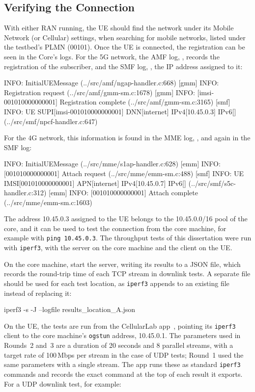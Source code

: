 \subsection{Verifying the Connection}
\label{sec:app-verify}
With either \gls{RAN} running, the \gls{UE} should find the network under its Mobile Network (or Cellular) settings, when searching for mobile networks, listed under the testbed's \gls{PLMN} (00101). Once the \gls{UE} is connected, the registration can be seen in the Core's logs. For the 5G network, the \gls{AMF} log, , records the registration of the subscriber, and the \gls{SMF} log, , the IP address assigned to it:
\begin{code}
[amf] INFO: InitialUEMessage (../src/amf/ngap-handler.c:668)
[gmm] INFO: Registration request (../src/amf/gmm-sm.c:1678)
[gmm] INFO: [imsi-001010000000001] Registration complete (../src/amf/gmm-sm.c:3165)
[smf] INFO: UE SUPI[imsi-001010000000001] DNN[internet] IPv4[10.45.0.3] IPv6[] (../src/smf/npcf-handler.c:647)
\end{code}
For the 4G network, this information is found in the \gls{MME} log, , and again in the \gls{SMF} log:
\begin{code}
[mme] INFO: InitialUEMessage (../src/mme/s1ap-handler.c:628)
[emm] INFO: [001010000000001] Attach request (../src/mme/emm-sm.c:488)
[smf] INFO: UE IMSI[001010000000001] APN[internet] IPv4[10.45.0.7] IPv6[] (../src/smf/s5c-handler.c:312)
[emm] INFO: [001010000000001] Attach complete (../src/mme/emm-sm.c:1603)
\end{code}
The address 10.45.0.3 assigned to the \gls{UE} belongs to the 10.45.0.0/16 pool of the core, and it can be used to test the connection from the core machine, for example with \texttt{ping 10.45.0.3}. The throughput tests of this dissertation were run with \texttt{iperf3}, with the server on the core machine and the client on the \gls{UE}.

On the core machine, start the server, writing its results to a JSON file, which records the round-trip time of each TCP stream in downlink tests. A separate file should be used for each test location, as \texttt{iperf3} appends to an existing file instead of replacing it:

\begin{code}
iperf3 -s -J --logfile results_location_A.json
\end{code}

On the \gls{UE}, the tests are run from the CellularLab app~\cite{cellularlab}, pointing its \texttt{iperf3} client to the core machine's \texttt{ogstun} address, 10.45.0.1. The parameters used in Rounds~2 and~3 are a duration of 20 seconds and 8 parallel streams, with a target rate of 100\,Mbps per stream in the case of UDP tests; Round~1 used the same parameters with a single stream. The app runs these as standard \texttt{iperf3} commands and records the exact command at the top of each result it exports. For a UDP downlink test, for example:

